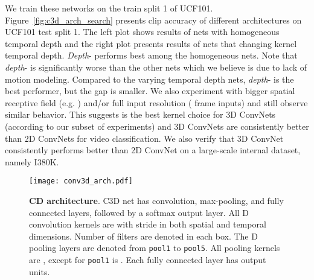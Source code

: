 \documentclass[10pt,twocolumn,letterpaper]{article}
\begin{document}
We train these networks on the train split 1 of UCF101. Figure~\ref{fig:c3d_arch_search} presents clip accuracy of different architectures on UCF101 test split 1. The left plot shows results of nets with homogeneous temporal depth and the right plot presents results of nets that changing kernel temporal depth. \emph{Depth}- performs best among the homogeneous nets. Note that \emph{depth}- is significantly worse than the other nets which we believe is due to lack of motion modeling. Compared to the varying temporal depth nets, \emph{depth}- is the best performer, but the gap is smaller. We also experiment with bigger spatial receptive field (e.g. ) and/or full input resolution ( frame inputs) and still observe similar behavior. This suggests  is the best kernel choice for 3D ConvNets (according to our subset of experiments) and 3D ConvNets are consistently better than 2D ConvNets for video classification. We also verify that 3D ConvNet consistently performs better than 2D ConvNet on a large-scale internal dataset, namely I380K.



\begin{figure*}
\begin{center}
   \texttt{[image: conv3d\_arch.pdf]}
\end{center}
\vspace{-18px}
   \caption{{\bf CD architecture}. C3D net has  convolution,  max-pooling, and  fully connected layers, followed by a softmax output layer. All D convolution kernels are  with stride  in both spatial and temporal dimensions. Number of filters are denoted in each box. The D pooling layers are denoted from \texttt{pool1} to \texttt{pool5}. All pooling kernels are , except for \texttt{pool1} is . Each fully connected layer has  output units.}
\label{fig:conv3d}
\end{figure*}
\end{document}
